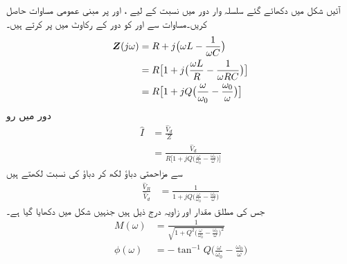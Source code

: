 آئیں شکل  میں دکھائے گئے سلسلہ وار  دور  میں   نسبت کے لیے ،  اور  پر مبنی عمومی مساوات حاصل کریں۔مساوات  سے  اور  کو دور کے رکاوٹ میں  پر کرتے ہیں۔
\begin{align*}
{\ensuremath{{\boldsymbol{Z}}}}(j\omega)&=R+j\big(\omega L-\frac{1}{\omega C}\big)\\
&=R\big[1+j\big(\frac{\omega L}{R} -\frac{1}{\omega RC}\big)\big]\\
&=R\big[1+jQ\big(\frac{\omega}{\omega_0}-\frac{\omega_0}{\omega}\big)\big]
\end{align*}
دور میں رو
\begin{align*}
\hat{I}&=\frac{\hat{V}_d}{Z}\\
&=\frac{\hat{V}_d}{R\big[1+jQ\big(\frac{\omega}{\omega_0}-\frac{\omega_0}{\omega}\big)\big]}
\end{align*}
سے مزاحمتی دباؤ  لکھ کر دباؤ کی نسبت  لکھتے ہیں
\begin{align*}
\frac{\hat{V}_R}{\hat{V}_d}&=\frac{1}{1+jQ\big(\frac{\omega}{\omega_0}-\frac{\omega_0}{\omega}\big)}
\end{align*}
جس کی مطلق مقدار  اور زاویہ  درج ذیل ہیں جنہیں شکل  میں دکھایا گیا ہے۔
\begin{align}
M(\omega)&=\frac{1}{\sqrt{1+Q^2\big(\frac{\omega}{\omega_0}-\frac{\omega_0}{\omega}\big)^2}}\label{مساوات_تعددی_مقداری_عمومی}\\
\phi(\omega)&=-\tan^{-1} Q\big(\frac{\omega}{\omega_0}-\frac{\omega_0}{\omega}\big)\label{مساوات_تعددی_زاویائی_عمومی}
\end{align}
%

